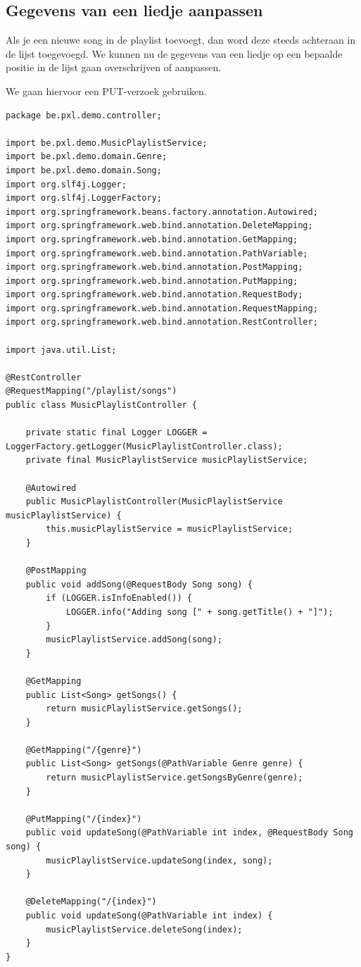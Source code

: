 \subsection{Gegevens van een liedje aanpassen}

Als je een nieuwe song in de playlist toevoegt, dan word deze steeds achteraan in de lijst toegevoegd. We kunnen nu de gegevens van een liedje op een bepaalde positie in de lijst gaan overschrijven of aanpassen.

We gaan hiervoor een PUT-verzoek gebruiken.

\begin{lstlisting}
package be.pxl.demo.controller;

import be.pxl.demo.MusicPlaylistService;
import be.pxl.demo.domain.Genre;
import be.pxl.demo.domain.Song;
import org.slf4j.Logger;
import org.slf4j.LoggerFactory;
import org.springframework.beans.factory.annotation.Autowired;
import org.springframework.web.bind.annotation.DeleteMapping;
import org.springframework.web.bind.annotation.GetMapping;
import org.springframework.web.bind.annotation.PathVariable;
import org.springframework.web.bind.annotation.PostMapping;
import org.springframework.web.bind.annotation.PutMapping;
import org.springframework.web.bind.annotation.RequestBody;
import org.springframework.web.bind.annotation.RequestMapping;
import org.springframework.web.bind.annotation.RestController;

import java.util.List;

@RestController
@RequestMapping("/playlist/songs")
public class MusicPlaylistController {

	private static final Logger LOGGER = LoggerFactory.getLogger(MusicPlaylistController.class);
	private final MusicPlaylistService musicPlaylistService;

	@Autowired
	public MusicPlaylistController(MusicPlaylistService musicPlaylistService) {
		this.musicPlaylistService = musicPlaylistService;
	}

	@PostMapping
	public void addSong(@RequestBody Song song) {
		if (LOGGER.isInfoEnabled()) {
			LOGGER.info("Adding song [" + song.getTitle() + "]");
		}
		musicPlaylistService.addSong(song);
	}

	@GetMapping
	public List<Song> getSongs() {
		return musicPlaylistService.getSongs();
	}

	@GetMapping("/{genre}")
	public List<Song> getSongs(@PathVariable Genre genre) {
		return musicPlaylistService.getSongsByGenre(genre);
	}

	@PutMapping("/{index}")
	public void updateSong(@PathVariable int index, @RequestBody Song song) {
		musicPlaylistService.updateSong(index, song);
	}

	@DeleteMapping("/{index}")
	public void updateSong(@PathVariable int index) {
		musicPlaylistService.deleteSong(index);
	}
}
\end{lstlisting}

